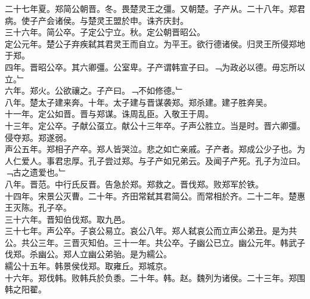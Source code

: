 \documentclass{zhvt-classic}
\begin{document}
\hspace*{2em}二十七年夏。郑简公朝晋。冬。畏楚灵王之彊。又朝楚。子产从。二十八年。郑君病。使子产会诸侯。与楚灵王盟於申。诛齐庆封。\\
\hspace*{2em}三十六年。简公卒。子定公宁立。秋。定公朝晋昭公。\\
\hspace*{2em}定公元年。楚公子弃疾弑其君灵王而自立。为平王。欲行德诸侯。归灵王所侵郑地于郑。\\
\hspace*{2em}四年。晋昭公卒。其六卿彊。公室卑。子产谓韩宣子曰。﹁为政必以德。毋忘所以立。﹂\\
\hspace*{2em}六年。郑火。公欲禳之。子产曰。﹁不如修德。﹂\\
\hspace*{2em}八年。楚太子建来奔。十年。太子建与晋谋袭郑。郑杀建。建子胜奔吴。\\
\hspace*{2em}十一年。定公如晋。晋与郑谋。诛周乱臣。入敬王于周。\\
\hspace*{2em}十三年。定公卒。子献公虿立。献公十三年卒。子声公胜立。当是时。晋六卿彊。侵夺郑。郑遂弱。\\
\hspace*{2em}声公五年。郑相子产卒。郑人皆哭泣。悲之如亡亲戚。子产者。郑成公少子也。为人仁爱人。事君忠厚。孔子尝过郑。与子产如兄弟云。及闻子产死。孔子为泣曰。﹁古之遗爱也。﹂\\
\hspace*{2em}八年。晋范。中行氏反晋。告急於郑。郑救之。晋伐郑。败郑军於铁。\\
\hspace*{2em}十四年。宋景公灭曹。二十年。齐田常弑其君简公。而常相於齐。二十二年。楚惠王灭陈。孔子卒。\\
\hspace*{2em}三十六年。晋知伯伐郑。取九邑。\\
\hspace*{2em}三十七年。声公卒。子哀公易立。哀公八年。郑人弑哀公而立声公弟丑。是为共公。共公三年。三晋灭知伯。三十一年。共公卒。子幽公已立。幽公元年。韩武子伐郑。杀幽公。郑人立幽公弟骀。是为繻公。\\
\hspace*{2em}繻公十五年。韩景侯伐郑。取雍丘。郑城京。\\
\hspace*{2em}十六年。郑伐韩。败韩兵於负黍。二十年。韩。赵。魏列为诸侯。二十三年。郑围韩之阳翟。\\
\end{document}
